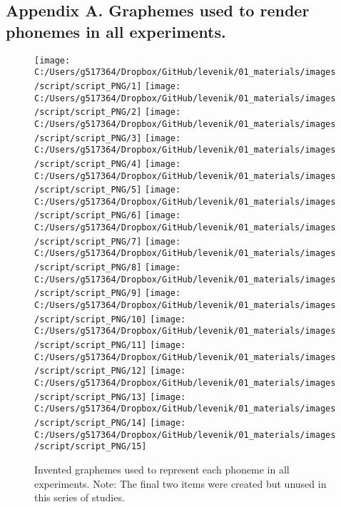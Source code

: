 \documentclass[doc,floatsintext]{apa6}
\begin{document}
\begin{appendix}
\section{}
\subsection{Appendix A. Graphemes used to render phonemes in all
experiments.}\label{appendix-a}

\begin{figure}[htb]

{\centering \texttt{[image: C:/Users/g517364/Dropbox/GitHub/levenik/01\_materials/images/script/script\_PNG/1]} \texttt{[image: C:/Users/g517364/Dropbox/GitHub/levenik/01\_materials/images/script/script\_PNG/2]} \texttt{[image: C:/Users/g517364/Dropbox/GitHub/levenik/01\_materials/images/script/script\_PNG/3]} \texttt{[image: C:/Users/g517364/Dropbox/GitHub/levenik/01\_materials/images/script/script\_PNG/4]} \texttt{[image: C:/Users/g517364/Dropbox/GitHub/levenik/01\_materials/images/script/script\_PNG/5]} \texttt{[image: C:/Users/g517364/Dropbox/GitHub/levenik/01\_materials/images/script/script\_PNG/6]} \texttt{[image: C:/Users/g517364/Dropbox/GitHub/levenik/01\_materials/images/script/script\_PNG/7]} \texttt{[image: C:/Users/g517364/Dropbox/GitHub/levenik/01\_materials/images/script/script\_PNG/8]} \texttt{[image: C:/Users/g517364/Dropbox/GitHub/levenik/01\_materials/images/script/script\_PNG/9]} \texttt{[image: C:/Users/g517364/Dropbox/GitHub/levenik/01\_materials/images/script/script\_PNG/10]} \texttt{[image: C:/Users/g517364/Dropbox/GitHub/levenik/01\_materials/images/script/script\_PNG/11]} \texttt{[image: C:/Users/g517364/Dropbox/GitHub/levenik/01\_materials/images/script/script\_PNG/12]} \texttt{[image: C:/Users/g517364/Dropbox/GitHub/levenik/01\_materials/images/script/script\_PNG/13]} \texttt{[image: C:/Users/g517364/Dropbox/GitHub/levenik/01\_materials/images/script/script\_PNG/14]} \texttt{[image: C:/Users/g517364/Dropbox/GitHub/levenik/01\_materials/images/script/script\_PNG/15]} 

}

\caption{Invented graphemes used to represent each phoneme in all experiments. Note: The final two items were created but unused in this series of studies.}\label{fig:unnamed-chunk-5}
\end{figure}
\end{appendix}
\end{document}

